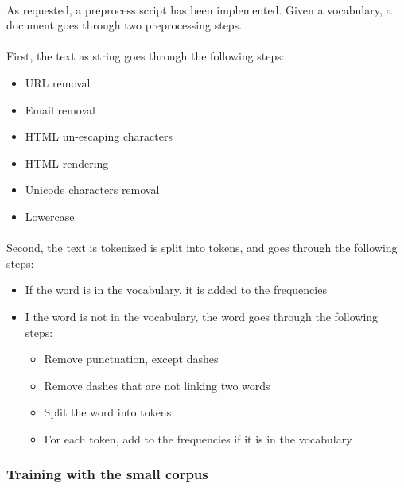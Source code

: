\documentclass{article}
\begin{document}
\paragraph{} As requested, a preprocess script has been implemented. Given a vocabulary, a document goes through two preprocessing steps.

\paragraph{} First, the text as string goes through the following steps:

\begin{itemize}
    \item URL removal
    \item Email removal
    \item HTML un-escaping characters
    \item HTML rendering
    \item Unicode characters removal
    \item Lowercase
\end{itemize}

\paragraph{} Second, the text is tokenized is split into tokens, and goes through the following steps:

\begin{itemize}
    \item If the word is in the vocabulary, it is added to the frequencies
    \item I the word is not in the vocabulary, the word goes through the following steps:
        \begin{itemize}
            \item Remove punctuation, except dashes
            \item Remove dashes that are not linking two words
            \item Split the word into tokens
            \item For each token, add to the frequencies if it is in the vocabulary
        \end{itemize}
\end{itemize}

\clearpage

\subsubsection*{Training with the small corpus}
\end{document}
